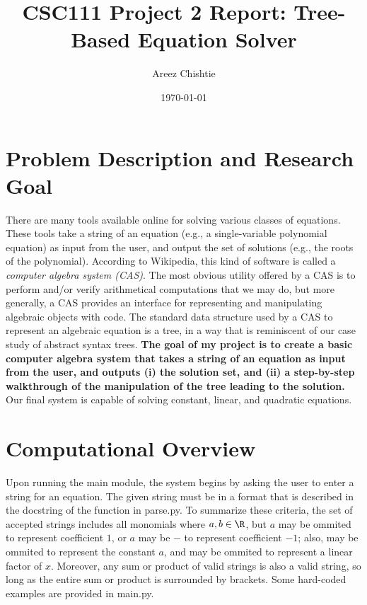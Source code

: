 \documentclass[11pt]{article}
\title{CSC111 Project 2 Report: Tree-Based Equation Solver}
\author{Areez Chishtie}
\date{\today}
\begin{document}
\maketitle

\section*{Problem Description and Research Goal}

There are many tools available online for solving various classes of equations. These tools take a string of an equation (e.g., a single-variable polynomial equation) as input from the user, and output the set of solutions (e.g., the roots of the polynomial). According to Wikipedia, this kind of software is called a \textit{computer algebra system (CAS)}. The most obvious utility offered by a CAS is to perform and/or verify arithmetical computations that we may do, but more generally, a CAS provides an interface for representing and manipulating algebraic objects with code. The standard data structure used by a CAS to represent an algebraic equation is a tree, in a way that is reminiscent of our case study of abstract syntax trees. \textbf{The goal of my project is to create a basic computer algebra system that takes a string of an equation as input from the user, and outputs (i) the solution set, and (ii) a step-by-step walkthrough of the manipulation of the tree leading to the solution.} Our final system is capable of solving constant, linear, and quadratic equations.

\section*{Computational Overview}

Upon running the main module, the system begins by asking the user to enter a string for an equation. The given string must be in a format that is described in the docstring of the function  in parse.py. To summarize these criteria, the set of accepted strings includes all monomials  where $a, b \in \R$, but $a$ may be ommited to represent coefficient $1$, or $a$ may be $-$ to represent coefficient $-1$; also,  may be ommited to represent the constant $a$, and  may be ommited to represent a linear factor of $x$. Moreover, any sum or product of valid strings is also a valid string, so long as the entire sum or product is surrounded by brackets. Some hard-coded examples are provided in main.py.
\end{document}
